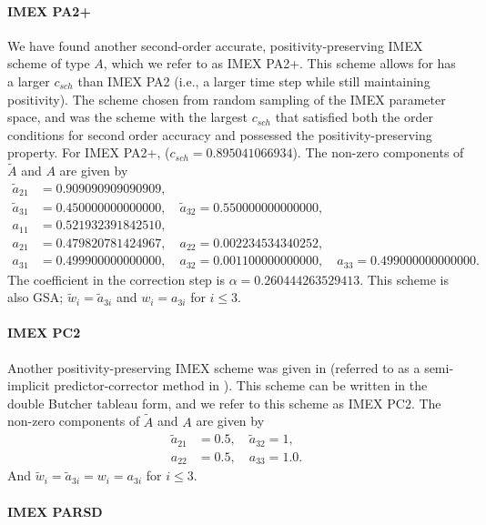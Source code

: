 \paragraph{IMEX PA2+}

We have found another second-order accurate, positivity-preserving IMEX scheme of type $A$, which we refer to as IMEX PA2+.  
This scheme allows for has a larger $c_{sch}$ than IMEX PA2 (i.e., a larger time step while still maintaining positivity).  
The scheme chosen from random sampling of the IMEX parameter space, and was the scheme with the largest $c_{sch}$ that satisfied both the order conditions for second order accuracy and possessed the positivity-preserving property.  
For IMEX PA2+, ($c_{sch} = 0.895041066934$). 
The non-zero components of $\tilde{A}$ and $A$ are given by
\begin{align}
  \tilde{a}_{21} &= 0.909090909090909, \nonumber \\
  \tilde{a}_{31} &= 0.450000000000000, \quad \tilde{a}_{32} = 0.550000000000000, \nonumber \\
  a_{11} &= 0.521932391842510, \nonumber \\
  a_{21} &= 0.479820781424967, \quad a_{22} = 0.002234534340252, \nonumber \\
  a_{31} &= 0.499900000000000, \quad a_{32} = 0.001100000000000, \quad a_{33} = 0.499000000000000. \nonumber
\end{align}
The coefficient in the correction step is $\alpha = 0.260444263529413$.  
This scheme is also GSA; $\tilde{w}_{i}=\tilde{a}_{3i}$ and $w_{i}=a_{3i}$ for $i\le3$.

\paragraph{IMEX PC2}

Another positivity-preserving IMEX scheme was given in \cite{mcclareen_2008} (referred to as a semi-implicit predictor-corrector method in \cite{mcclareen_2008}).  
This scheme can be written in the double Butcher tableau form, and we refer to this scheme as IMEX PC2.  
The non-zero components of $\tilde{A}$ and $A$ are given by
\begin{align}
  \tilde{a}_{21} &= 0.5, \quad \tilde{a}_{32} = 1, \nonumber \\
  a_{22} &= 0.5, \quad a_{33} = 1.0. \nonumber
\end{align}
And $\tilde{w}_{i}=\tilde{a}_{3i} = w_{i}=a_{3i}$ for $i\le3$.

\paragraph{IMEX PARSD}


